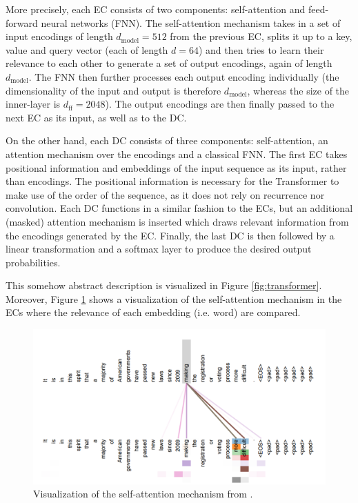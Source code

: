 \documentclass[11pt,a4paper]{article}
\begin{document}
More precisely, each EC consists of two components: self-attention and feed-forward neural networks (FNN). The self-attention mechanism takes in a set of input encodings of length $d_{\text{model}} = 512$ from the previous EC, splits it up to a key, value and query vector (each of length $d = 64$) and then tries to learn their relevance to each other to generate a set of output encodings, again of length $d_{\text{model}}$. The FNN then further processes each output encoding individually (the dimensionality of the input and output is therefore $d_{\text{model}}$, whereas the size of the inner-layer is $d_{\text{ff}} = 2048$). The output encodings are then finally passed to the next EC as its input, as well as to the DC.

On the other hand, each DC consists of three components: self-attention, an attention mechanism over the encodings and a classical FNN. The first EC takes positional information and embeddings of the input sequence as its input, rather than encodings. The positional information is necessary for the Transformer to make use of the order of the sequence, as it does not rely on recurrence nor convolution. Each DC functions in a similar fashion to the ECs, but an additional (masked) attention mechanism is inserted which draws relevant information from the encodings generated by the EC. Finally, the last DC is then followed by a linear transformation and a softmax layer to produce the desired output probabilities.

This somehow abstract description is visualized in Figure \ref{fig:transformer}. Moreover, Figure \ref{fig:attention} shows a visualization of the self-attention mechanism in the ECs where the relevance of each embedding (i.e. word) are compared.

\begin{figure}[ht]
    \centering
    \includegraphics[scale=0.7]{images/attention.PNG}
    \caption{Visualization of the self-attention mechanism from \cite{transformer}.}
    \label{fig:attention}
\end{figure}
\end{document}
